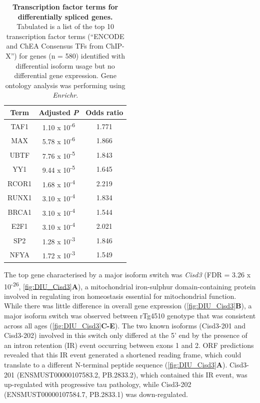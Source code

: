 \begin{table}[]
	\centering
	\captionsetup{width=0.95\textwidth,singlelinecheck=off}
	\caption[Transcription factor terms for differentially spliced genes]%
	{\textbf{Transcription factor terms for differentially spliced genes.} Tabulated is a list of the top 10 transcription factor terms (“ENCODE and ChEA Consensus TFs from ChIP-X”) for genes (n = 580) identified with differential isoform usage but no differential gene expression. Gene ontology analysis was performing using \textit{Enrichr}.}
	\label{tab: df_enrichr}
	\begin{tabular}{@{}ccc@{}}
		\toprule
		Term   & Adjusted \textit{P} & Odds ratio \\ \midrule
		TAF1   & 1.10 x 10\textsuperscript{-6}         & 1.771      \\
		MAX    & 5.78 x 10\textsuperscript{-6}         & 1.866      \\
		UBTF   & 7.76 x 10\textsuperscript{-5}          & 1.843      \\
		YY1    & 9.44 x 10\textsuperscript{-5}          & 1.645      \\
		RCOR1  & 1.68 x 10\textsuperscript{-4}         & 2.219      \\
		RUNX1  & 3.10 x 10\textsuperscript{-4}         & 1.834      \\
		BRCA1  & 3.10 x 10\textsuperscript{-4}         & 1.544      \\
		E2F1   & 3.10 x 10\textsuperscript{-4}         & 2.021      \\
		SP2    & 1.28 x 10\textsuperscript{-3}          & 1.846      \\
		NFYA   & 1.72 x 10\textsuperscript{-3}          & 1.549      \\ \bottomrule
	\end{tabular}
\end{table}

The top gene characterised by a major isoform switch was \textit{Cisd3} (FDR = 3.26 x 10\textsuperscript{-26}, \cref{fig:DIU_Cisd3}\textbf{A}), a mitochondrial iron-sulphur domain-containing protein involved in regulating iron homeostasis essential for mitochondrial function\cite{Wiley2007}. While there was little difference in overall gene expression (\cref{fig:DIU_Cisd3}\textbf{B}), a major isoform switch was observed between rTg4510 genotype that was consistent across all ages (\cref{fig:DIU_Cisd3}\textbf{C-E}). The two known isoforms (Cisd3-201 and Cisd3-202) involved in this switch only differed at the 5' end by the presence of an intron retention (IR) event occurring between exons 1 and 2. ORF predictions revealed that this IR event generated a shortened reading frame, which could translate to a different N-terminal peptide sequence (\cref{fig:DIU_Cisd3}\textbf{A}). Cisd3-201 (ENSMUST00000107583.2, PB.2833.2), which contained this IR event, was up-regulated with progressive tau pathology, while Cisd3-202 (ENSMUST00000107584.7, PB.2833.1) was down-regulated.  

